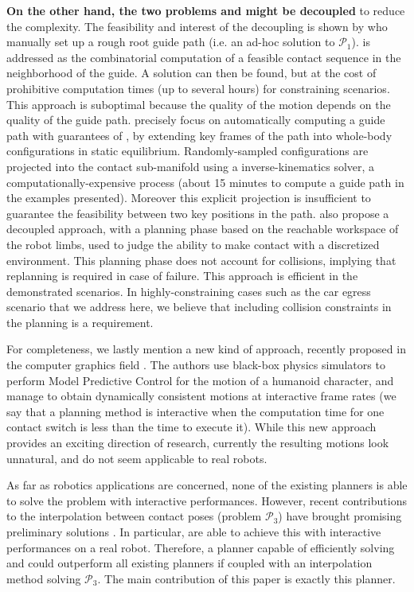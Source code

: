 \textbf{On the other hand, the two problems \Pa and \Pb might be decoupled} to reduce the complexity. The feasibility and interest of the decoupling is shown by \citeauthor{DBLP:conf/iser/EscandeKMG08} who manually set up a rough root guide path (i.e. an ad-hoc solution to $\mathcal{P}_1$). \Pb is addressed as the combinatorial computation of a feasible contact sequence in the neighborhood of the guide. A solution can then be found, %
but at the cost of prohibitive computation times (up to several hours) for constraining scenarios. This approach is suboptimal because the quality of the motion depends on the quality of the guide path. \citeauthor{Bouyarmane2009} precisely focus on automatically computing a guide path with guarantees of , by extending key frames of the path into whole-body configurations in static equilibrium. Randomly-sampled configurations are projected into the contact sub-manifold using a inverse-kinematics solver, a computationally-expensive process (about 15 minutes to compute a guide path in the examples presented). Moreover this explicit projection is insufficient to guarantee the feasibility between two key positions in the path. \citeauthor{7140082} also propose a decoupled approach, with a planning phase based on the reachable workspace of the robot limbs, used to judge the ability to make contact with 
a discretized environment. This planning phase does not account for collisions, implying that replanning is required in case of failure. This approach is efficient 
in the demonstrated scenarios. In highly-constraining cases such 
as the car egress scenario that we address here, we believe that including collision constraints in the planning is a requirement.

For completeness, we lastly mention a new kind of approach, recently proposed in the computer graphics field \citep{hamalainen_cpbp_2015}. The authors
use black-box physics simulators to perform Model Predictive Control for the motion of a humanoid character, and manage to obtain dynamically consistent motions
at \gls{interactive} frame rates (we say that a planning method is interactive when the computation time for one contact switch is less than the
time to execute it). While this new approach provides an exciting direction of research, currently the resulting motions
look unnatural, and do not seem applicable to real robots.

As far as robotics applications are concerned, none of the existing planners is able to solve the problem with \gls{interactive} performances.
However, recent contributions to the interpolation between contact poses (problem $\mathcal{P}_3$) have brought promising preliminary solutions \citep{Hauser2014, herzog2015trajectory, Park116, Carpentier2016}. In particular, \citeauthor{Carpentier2016} are able to achieve this with \gls{interactive} performances on a real robot.
Therefore, a planner capable of efficiently solving \Pa and \Pb could outperform all existing planners if coupled with an interpolation method solving $\mathcal{P}_3$.
The main contribution of this paper is exactly this planner.

